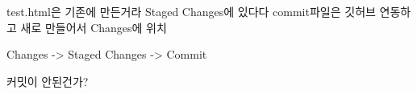 test.html은 기존에 만든거라 Staged Changes에 있다다
commit파일은 깃허브 연동하고 새로 만들어서 Changes에 위치

Changes -> Staged Changes -> Commit

커밋이 안된건가?

